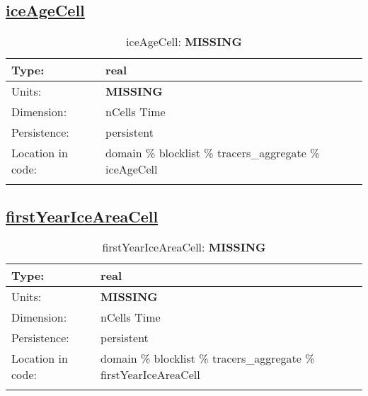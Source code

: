 \subsection[iceAgeCell]{\hyperref[sec:var_tab_tracers_aggregate]{iceAgeCell}}
\label{subsec:var_sec_tracers_aggregate_iceAgeCell}
\begin{center}
\begin{longtable}{| p{2.0in} | p{4.0in} |}
        \hline 
        Type: & real \\
        \hline 
        Units: & {\bf \color{red} MISSING} \\
        \hline 
        Dimension: & nCells Time \\
        \hline 
        Persistence: & persistent \\
        \hline 
         Location in code: & domain \% blocklist \% tracers\_aggregate \% iceAgeCell \\
         \hline 
    \caption{iceAgeCell: {\bf \color{red} MISSING}}
\end{longtable}
\end{center}
\subsection[firstYearIceAreaCell]{\hyperref[sec:var_tab_tracers_aggregate]{firstYearIceAreaCell}}
\label{subsec:var_sec_tracers_aggregate_firstYearIceAreaCell}
\begin{center}
\begin{longtable}{| p{2.0in} | p{4.0in} |}
        \hline 
        Type: & real \\
        \hline 
        Units: & {\bf \color{red} MISSING} \\
        \hline 
        Dimension: & nCells Time \\
        \hline 
        Persistence: & persistent \\
        \hline 
         Location in code: & domain \% blocklist \% tracers\_aggregate \% firstYearIceAreaCell \\
         \hline 
    \caption{firstYearIceAreaCell: {\bf \color{red} MISSING}}
\end{longtable}
\end{center}
